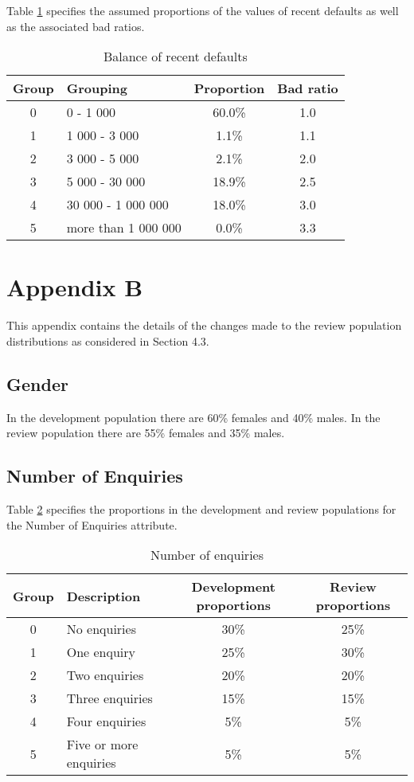 \documentclass{article}
\theoremstyle{def}
\begin{document}
Table \ref{BalRec_param} specifies the assumed proportions of the values of recent defaults as well as the associated bad ratios.
\begin{table}[H]%
\caption{Balance of recent defaults}
\label{BalRec_param}
\centering
\small
\begin{tabular}{clcc}
\hline
Group & Grouping & Proportion & Bad ratio \\
\hline
0 & 0 - 1 000 & 60.0\% & 1.0\\
1 & 1 000 - 3 000 & 1.1\% & 1.1\\
2 & 3 000 - 5 000 & 2.1\% & 2.0\\
3 & 5 000 - 30 000 & 18.9\% & 2.5\\
4 & 30 000 - 1 000 000 & 18.0\% & 3.0\\
5 & more than 1 000 000 & 0.0\% & 3.3\\
\hline
\end{tabular}
\end{table}

\setcounter{section}{6}
\section{Appendix B}

This appendix contains the details of the changes made to the review population distributions as considered in Section 4.3.

\subsection{Gender}

In the development population there are 60\% females and 40\% males. In the review population there are 55\% females and 35\% males.

\subsection{Number of Enquiries}

Table \ref{NumEnq_unstablechange} specifies the proportions in the development and review populations for the Number of Enquiries attribute.
\begin{table}[H]%
\caption{Number of enquiries}
\label{NumEnq_unstablechange}
\centering
\small
\begin{tabular}{clcc}
\hline
Group & Description & Development proportions & Review proportions \\
\hline
0 & No enquiries & 30\%  & 25\%\\
1 & One enquiry & 25\%  & 30\%\\
2 & Two enquiries & 20\% & 20\%\\
3 & Three enquiries & 15\% & 15\%\\
4 & Four enquiries & 5\% & 5\%\\
5 & Five or more enquiries & 5\% & 5\%\\
\hline
\end{tabular}
\end{table}   
\end{document}
